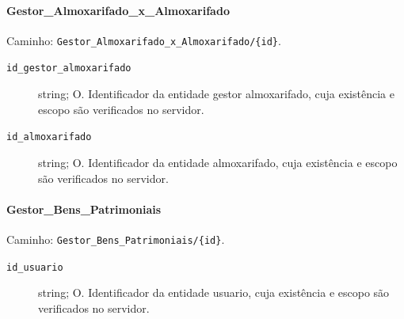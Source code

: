 \paragraph{Gestor\_Almoxarifado\_x\_Almoxarifado}\mbox{}\par
Caminho: \texttt{Gestor\_Almoxarifado\_x\_Almoxarifado/\{id\}}.
\begin{description}
\item[\texttt{id\_gestor\_almoxarifado}] string; O. Identificador da entidade gestor almoxarifado, cuja existência e escopo são verificados no servidor.
\item[\texttt{id\_almoxarifado}] string; O. Identificador da entidade almoxarifado, cuja existência e escopo são verificados no servidor.
\end{description}

\paragraph{Gestor\_Bens\_Patrimoniais}\mbox{}\par
Caminho: \texttt{Gestor\_Bens\_Patrimoniais/\{id\}}.
\begin{description}
\item[\texttt{id\_usuario}] string; O. Identificador da entidade usuario, cuja existência e escopo são verificados no servidor.
\end{description}

